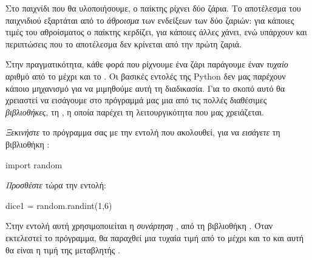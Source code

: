 \documentclass[a4paper,11pt,oneside]{book}
\begin{document}

Στο παιχνίδι που θα υλοποιήσουμε, ο παίκτης ρίχνει δύο ζάρια. Το αποτέλεσμα του παιχνιδιού εξαρτάται από το \emph{άθροισμα} των ενδείξεων των δύο ζαριών: για κάποιες τιμές του αθροίσματος ο παίκτης κερδίζει, για κάποιες άλλες χάνει, ενώ υπάρχουν και περιπτώσεις που το αποτέλεσμα δεν κρίνεται από την πρώτη ζαριά.

Στην πραγματικότητα, κάθε φορά που ρίχνουμε ένα ζάρι παράγουμε έναν \emph{τυχαίο} αριθμό από το  μέχρι και το . Οι βασικές εντολές της Python δεν μας παρέχουν κάποιο μηχανισμό για να μιμηθούμε αυτή τη διαδικασία.
Για το σκοπό αυτό θα χρειαστεί να εισάγουμε στο πρόγραμμά μας μια από τις πολλές διαθέσιμες \emph{βιβλιοθήκες}, τη , η οποία παρέχει τη λειτουργικότητα που μας χρειάζεται.

\clearpage
\begin{step}
\emph{Ξεκινήστε} το πρόγραμμα σας με την εντολή που ακολουθεί, για να \emph{εισάγετε} τη βιβλιοθήκη :

\begin{pynew}
import random
\end{pynew}

\emph{Προσθέστε} τώρα την εντολή:

\begin{pynew}
dice1 = random.randint(1,6)
\end{pynew}

Στην εντολή αυτή χρησιμοποιείται η \emph{συνάρτηση} , από τη βιβλιοθήκη .
Όταν εκτελεστεί το πρόγραμμα, θα παραχθεί μια τυχαία τιμή από το  μέχρι και το  και αυτή θα είναι η τιμή της μεταβλητής .

\end{step}
\end{document}
